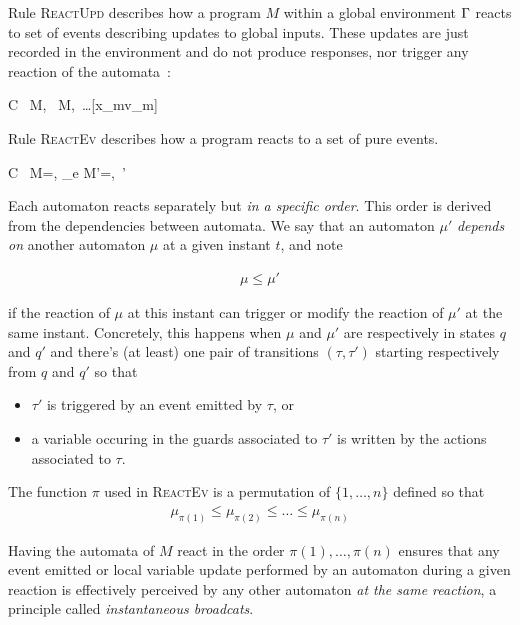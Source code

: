 \step Rule \textsc{ReactUpd} describes how a program $M$ within a global environment $\Gamma$ reacts to set
of events describing updates to global inputs. These updates are just recorded in the environment and do not produce
responses, nor trigger any reaction of the automata~:

\infrule[ReactUpd]
{}
{C \vdash\ M,\ \env {} M,\ \env[x_1\mapsto
  v_1]\ldots[x_m\mapsto v_m]}

\step
Rule \textsc{ReactEv} describes how a program reacts to a set of pure events.

{C \vdash\ M=\setn{\mu}, \env {}_e
  M'=,\ \env'}

Each automaton reacts
separately but \emph{in a specific order}. This order is derived from the dependencies between
automata. We say that an automaton $\mu'$ \emph{depends on} another automaton $\mu$ at a given
instant $t$, and note

\begin{eqnarray*}
  \mu \leq \mu'
\end{eqnarray*}

if the reaction of $\mu$ at this instant can trigger or modify the reaction of $\mu'$
at the same instant. Concretely, this happens when $\mu$ and $\mu'$ are respectively in states $q$
and $q'$ and there's (at least) one pair of transitions $(\tau,\tau')$ starting respectively from
$q$ and $q'$ so that
\begin{itemize}
\item $\tau'$ is triggered by an event emitted by $\tau$, or
\item a variable occuring in the guards associated to $\tau'$ is written by the actions associated
  to $\tau$.
\end{itemize}

The function $\pi$ used in \textsc{ReactEv} is a permutation of $\{1,\ldots,n\}$ defined so that
\begin{eqnarray*}
  \mu_{\pi(1)} \leq \mu_{\pi(2)} \leq \ldots \leq \mu_{\pi(n)}
\end{eqnarray*}

Having the automata of $M$ react in the order $\pi(1),\ldots,\pi(n)$ ensures that any event emitted or local
variable update performed by an automaton during a given reaction is effectively perceived by any
other automaton \emph{at the same reaction}, a principle called \emph{instantaneous broadcats}.


